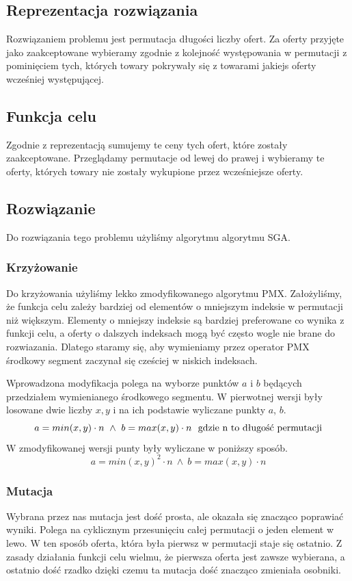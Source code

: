 \subsection{Reprezentacja rozwiązania}
Rozwiązaniem problemu jest permutacja długości liczby ofert.
Za oferty przyjęte jako zaakceptowane wybieramy zgodnie z kolejność występowania w permutacji z pominięciem tych, których towary pokrywały się z towarami jakiejs oferty wcześniej występującej.

\subsection{Funkcja celu}
Zgodnie z reprezentacją sumujemy te ceny tych ofert, które zostały zaakceptowane. Przeglądamy permutacje od lewej do prawej i wybieramy te oferty, których towary nie zostały wykupione przez wcześniejsze oferty.

\subsection{Rozwiązanie}
Do rozwiązania tego problemu użyliśmy algorytmu algorytmu SGA.
\subsubsection{Krzyżowanie}
Do krzyżowania użyliśmy lekko zmodyfikowanego algorytmu PMX.
Założyliśmy, że funkcja celu zależy bardziej od elementów o mniejszym indeksie w permutacji niż większym.
Elementy o mniejszy indeksie są bardziej preferowane co wynika z funkcji celu, a oferty o dalszych indeksach mogą być często wogle nie brane do rozwiazania.
Dlatego staramy się, aby wymieniamy przez operator PMX środkowy segment zaczynał się cześciej w niskich indeksach.


Wprowadzona modyfikacja polega na wyborze punktów $a$ i $b$ będących przedziałem wymienianego środkowego segmentu.
W pierwotnej wersji były losowane dwie liczby $x, y$ i na ich podstawie wyliczane punkty $a$, $b$.
\begin{equation}
    a = min(x, y) \cdot n \ \wedge \ b = max(x, y) \cdot n \ \ \hbox{gdzie n to długość permutacji}
\end{equation}
W zmodyfikowanej wersji punty były wyliczane w poniższy sposób.
\begin{equation}
    a = min(x, y)^2 \cdot n \ \wedge \ b = max(x, y) \cdot n
\end{equation}

\subsubsection{Mutacja}
Wybrana przez nas mutacja jest dość prosta, ale okazała się znacząco poprawiać wyniki.
Polega na cyklicznym przesunięciu całej permutacji o jeden element w lewo. 
W ten sposób oferta, która była pierwsz w permutacji staje się ostatnio. 
Z zasady działania funkcji celu wielmu, że pierwsza oferta jest zawsze wybierana, a ostatnio dość rzadko dzięki czemu ta mutacja dość znacząco zmieniała osobniki.

